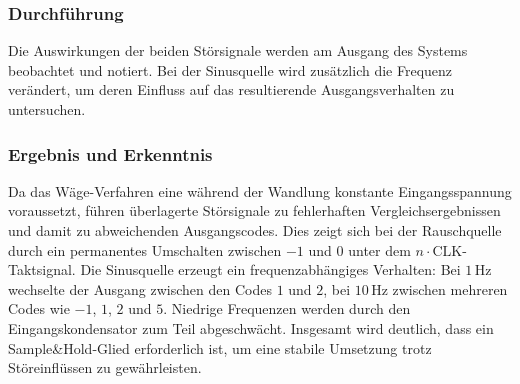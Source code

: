 \subsubsection{Durchführung}
Die Auswirkungen der beiden Störsignale werden am Ausgang des Systems beobachtet und
notiert. Bei der Sinusquelle wird zusätzlich die Frequenz verändert, um deren Einfluss
auf das resultierende Ausgangsverhalten zu untersuchen.

\subsubsection{Ergebnis und Erkenntnis}
Da das Wäge-Verfahren eine während der Wandlung konstante Eingangsspannung voraussetzt,
führen überlagerte Störsignale zu fehlerhaften Vergleichsergebnissen und damit zu
abweichenden Ausgangscodes. Dies zeigt sich bei der Rauschquelle durch ein permanentes
Umschalten zwischen \(-1\) und \(0\) unter dem \(n \cdot \mathrm{CLK}\)-Taktsignal.
Die Sinusquelle erzeugt ein frequenzabhängiges Verhalten: Bei \(1\,\mathrm{Hz}\)
wechselte der Ausgang zwischen den Codes \(1\) und \(2\), bei \(10\,\mathrm{Hz}\)
zwischen mehreren Codes wie \(-1\), \(1\), \(2\) und \(5\). Niedrige Frequenzen werden
durch den Eingangskondensator zum Teil abgeschwächt.
Insgesamt wird deutlich, dass ein Sample\&Hold-Glied erforderlich ist, um eine
stabile Umsetzung trotz Störeinflüssen zu gewährleisten.
